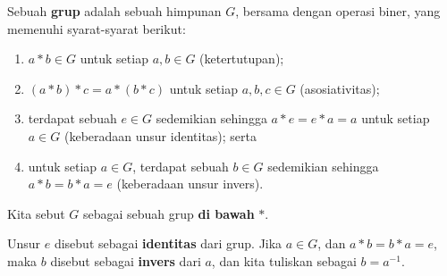 \begin{defn}
  Sebuah \textbf{grup} adalah sebuah himpunan $G$, bersama dengan operasi biner, yang memenuhi syarat-syarat berikut:
  \begin{enumerate}
  	\item $a * b \in G$ untuk setiap $a, b \in G$ (ketertutupan);
  	\item $(a * b) *c = a * (b * c)$ untuk setiap $a, b, c \in G$ (asosiativitas);
  	\item terdapat sebuah $e \in G$ sedemikian sehingga $a * e = e * a = a$ untuk setiap $a \in G$ (keberadaan unsur identitas); serta
  	\item untuk setiap $a \in G$, terdapat sebuah $b \in G$ sedemikian sehingga $a * b = b * a = e$ (keberadaan unsur invers).
  \end{enumerate}
\end{defn}

Kita sebut $G$ sebagai sebuah grup \textbf{di bawah} $*$.

Unsur $e$ disebut sebagai \textbf{identitas} dari grup. Jika $a \in G$, dan $a * b = b * a = e$, maka $b$ disebut sebagai \textbf{invers} dari $a$, dan kita tuliskan sebagai $b = a^{-1}$.